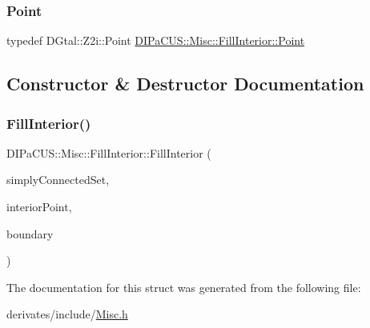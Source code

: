 \subsubsection{\texorpdfstring{Point}{Point}}
{\footnotesize\ttfamily typedef D\+Gtal\+::\+Z2i\+::\+Point \mbox{\hyperlink{structDIPaCUS_1_1Misc_1_1FillInterior_a88bed595883eb022eb4e9f093ee00d18}{D\+I\+Pa\+C\+U\+S\+::\+Misc\+::\+Fill\+Interior\+::\+Point}}}



\subsection{Constructor \& Destructor Documentation}
\mbox{\label{structDIPaCUS_1_1Misc_1_1FillInterior_a05ba475a43a025a4d06577b3ad20e298}} 
\subsubsection{\texorpdfstring{Fill\+Interior()}{FillInterior()}}
{\footnotesize\ttfamily D\+I\+Pa\+C\+U\+S\+::\+Misc\+::\+Fill\+Interior\+::\+Fill\+Interior (\begin{DoxyParamCaption}\item[{\mbox{\hyperlink{structDIPaCUS_1_1Misc_1_1FillInterior_a6fb325418d6c5f5e07619176576708aa}{Digital\+Set}} \&}]{simply\+Connected\+Set,  }\item[{const \mbox{\hyperlink{structDIPaCUS_1_1Misc_1_1FillInterior_a88bed595883eb022eb4e9f093ee00d18}{Point}} \&}]{interior\+Point,  }\item[{const \mbox{\hyperlink{structDIPaCUS_1_1Misc_1_1FillInterior_a6fb325418d6c5f5e07619176576708aa}{Digital\+Set}} \&}]{boundary }\end{DoxyParamCaption})\hspace{0.3cm}{\ttfamily [inline]}}



The documentation for this struct was generated from the following file\+:\begin{DoxyCompactItemize}
\item 
derivates/include/\mbox{\hyperlink{Misc_8h}{Misc.\+h}}\end{DoxyCompactItemize}
